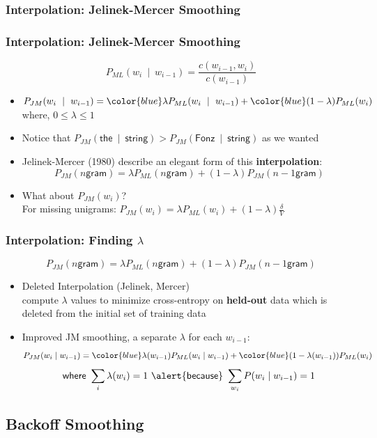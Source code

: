 \subsubsection{Interpolation: Jelinek-Mercer Smoothing}

\begin{frame}
\frametitle{Interpolation: Jelinek-Mercer Smoothing}
\[ P_{ML}(w_i~\mid~w_{i-1}) = \frac{ c(w_{i-1},w_i) } { c(w_{i-1}) } \]
\begin{itemize}[<+->]
\item $P_{JM}(w_i~\mid~w_{i-1}) = {\color{blue} \lambda} P_{ML}(w_i~\mid~w_{i-1}) +  {\color{blue} (1 - \lambda) }P_{ML}(w_{i})$ \\
 where, $0 \leq \lambda \leq 1$
\item Notice that  $P_{JM}(\textsf{the}~\mid~\textsf{string}) > P_{JM}(\textsf{Fonz}~\mid~\textsf{string})$ as we wanted
\item Jelinek-Mercer (1980) describe an elegant form of this {\bf interpolation}:
\[ P_{JM}(\textsf{$n$gram}) = \lambda P_{ML}(\textsf{$n$gram}) + (1 - \lambda) P_{JM}(\textsf{$n-1$gram}) \]
\item What about $P_{JM}(w_i)$? \\
For missing unigrams: $P_{JM}(w_i) = \lambda P_{ML}(w_i) + (1 - \lambda) \frac{\delta}{V}$
\end{itemize}
\end{frame}

\begin{frame}
\frametitle{Interpolation: Finding $\lambda$}
\[ P_{JM}(\textsf{$n$gram}) = \lambda P_{ML}(\textsf{$n$gram}) + (1 - \lambda) P_{JM}(\textsf{$n-1$gram}) \]
\begin{itemize}[<+->]
\item Deleted Interpolation (Jelinek, Mercer) \\
compute $\lambda$ values to minimize cross-entropy on {\bf held-out} data which is \alert{deleted} from the initial set of training data
\item Improved JM smoothing, a separate $\lambda$ for each $w_{i-1}$: 
\[ P_{JM}(w_i \mid w_{i-1}) = {\color{blue} \lambda(w_{i-1})} P_{ML}(w_i \mid w_{i-1}) + {\color{blue} (1 - \lambda(w_{i-1}))} P_{ML}(w_i) \]
\[ \textsf{where } \sum_i \lambda(w_i) = 1 \textsf{ \alert{because} } \sum_{w_i} P(w_i \mid w_{i-1}) = 1 \]
\end{itemize}
\end{frame}

\subsection{Backoff Smoothing}

